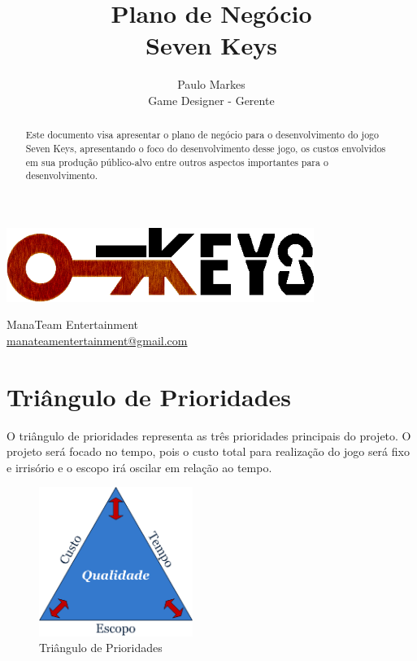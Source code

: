\documentclass[12pt]{article}
\title{Plano de Negócio\\Seven Keys}
\author{Paulo Markes\\Game Designer - Gerente}
\begin{document}
\begin{titlepage}
    \centering
    \maketitle
    \thispagestyle{empty}   %
    \includegraphics[width=10cm]{7keys.png}
    \vfill
    {\raggedright
    ManaTeam Entertainment\\
    \href{mailto:manateamentertainment@gmail.com}{manateamentertainment@gmail.com}\\
    }
\end{titlepage}

\begin{abstract}
Este documento visa apresentar o plano de negócio para o desenvolvimento do jogo Seven Keys, apresentando o foco do desenvolvimento desse jogo, os custos envolvidos em sua produção
público-alvo entre outros aspectos importantes para o desenvolvimento.
\end{abstract}

\pagebreak
\tableofcontents
\pagebreak

\section{Triângulo de Prioridades}

O triângulo de prioridades representa as três prioridades principais do projeto. O projeto será focado no tempo, pois o custo total para realização do jogo será fixo e irrisório e o escopo irá oscilar em relação ao tempo.

\begin{figure}[ht]
\centering
\includegraphics[width=5cm]{3_restricoes.png}
\caption{Triângulo de Prioridades}
\label{fig:restricoes}
\end{figure}
\end{document}
